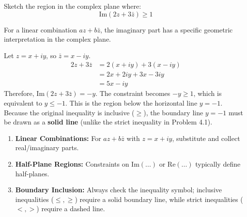 \begin{problem}
Sketch the region in the complex plane where:
\[ \text{Im}(2z + 3\bar{z}) \ge 1 \]
\end{problem}

\begin{hint}
For a linear combination $az + b\bar{z}$, the imaginary part has a specific geometric interpretation in the complex plane.
\end{hint}

\begin{solution}
Let $z = x + iy$, so $\bar{z} = x - iy$.
\begin{align*}
2z + 3\bar{z} &= 2(x + iy) + 3(x - iy) \\
&= 2x + 2iy + 3x - 3iy \\
&= 5x - iy
\end{align*}
Therefore, $\text{Im}(2z + 3\bar{z}) = -y$.
The constraint becomes $-y \ge 1$, which is equivalent to $y \le -1$.
This is the region below the horizontal line $y = -1$. Because the original inequality is inclusive ($\ge$), the boundary line $y = -1$ must be drawn as a \textbf{solid line} (unlike the strict inequality in Problem 4.1).
\begin{center}
\end{center}
\end{solution}

\begin{takeaways}
\begin{enumerate}
    \item \textbf{Linear Combinations:} For $az + b\bar{z}$ with $z = x + iy$, substitute and collect real/imaginary parts.
    \item \textbf{Half-Plane Regions:} Constraints on $\text{Im}(...)$ or $\text{Re}(...)$ typically define half-planes.
    \item \textbf{Boundary Inclusion:} Always check the inequality symbol; inclusive inequalities ($\le, \ge$) require a solid boundary line, while strict inequalities ($<, >$) require a dashed line.
\end{enumerate}
\end{takeaways}

